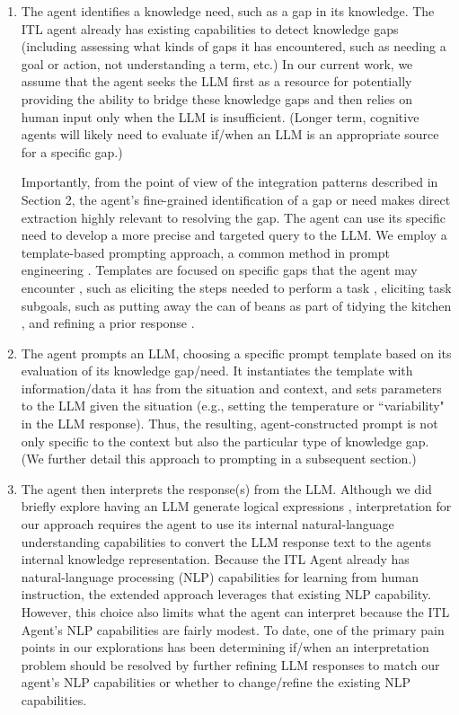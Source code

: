 \documentclass[letterpaper]{article} %
\begin{document}
\begin{enumerate}
\item The agent identifies a knowledge need, such as a gap in its knowledge. The ITL agent already has existing capabilities to detect knowledge gaps (including assessing what kinds of gaps it has encountered, such as needing a goal or action, not understanding a term, etc.) In our current work, we assume that the agent seeks the LLM first as a resource for potentially providing the ability to bridge these knowledge gaps and then relies on human input only when the LLM is insufficient. (Longer term, cognitive agents will likely need to evaluate if/when an LLM is an appropriate source for a specific gap.)

Importantly, from the point of view of the integration patterns described in Section 2, the agent's fine-grained identification of a gap or need makes direct extraction highly relevant to resolving the gap.  The agent can use its specific need to develop a more precise and targeted query to the LLM. We employ a template-based prompting approach, a common method in prompt engineering \cite{reynolds_prompt_2021}. Templates are focused on specific gaps that the agent may encounter \cite{wray_language_2021}, such as eliciting the steps needed to perform a task \cite{kirk_improving_2022}, eliciting task subgoals, such as putting away the can of beans as part of tidying the kitchen \cite{kirk_integrating_2023}, and refining a prior response \cite{kirk_improving_2023}.



\item The agent prompts an LLM, choosing a specific prompt template based on its evaluation of its knowledge gap/need. It instantiates the template with information/data it has from the situation and context, and sets parameters to the LLM given the situation (e.g., setting the temperature or ``variability" in the LLM response). Thus, the resulting, agent-constructed prompt is not only specific to the context but also the particular type of knowledge gap. (We further detail this approach to prompting in a subsequent section.)

\item The agent then interprets the response(s) from the LLM. Although we did briefly explore having an LLM generate logical expressions \cite{kirk_improving_2022}, interpretation for our approach requires the agent to use its internal natural-language understanding capabilities to convert the LLM response text to the agents internal knowledge representation. Because the ITL Agent already has natural-language processing (NLP) capabilities for learning from human instruction, the extended approach leverages that existing NLP capability. However, this choice also limits what the agent can interpret because the ITL Agent's NLP capabilities are fairly modest. To date, one of the primary pain points in our explorations has been determining if/when an interpretation problem should be resolved by further refining LLM responses to match our agent's NLP capabilities or whether to change/refine the existing NLP capabilities.


\end{enumerate}
\end{document}
